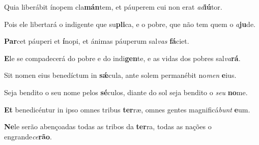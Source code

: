 \begin{greenumerate}
  \switchcolumn*


  \item Quia liberábit ínopem cla\textbf{mán}tem, {\GreStar} et páuperem cui non erat \textit{ad}\textbf{iú}tor. 

  \switchcolumn%

  \item Pois ele libertará o indigente que su\textbf{pli}ca, {\GreStar} e o pobre, que não tem quem o \textit{a}\textbf{ju}de. 

  \switchcolumn*


  \item \textbf{Par}cet páuperi et \textbf{í}nopi, {\GreStar} et ánimas páuperum sal\textit{vas} \textbf{fá}ciet. 

  \switchcolumn%

  \item \textbf{E}le se compadecerá do pobre e do indi\textbf{gen}te, {\GreStar} e as vidas dos pobres sal\textit{va}\textbf{rá}. 

  \switchcolumn*


  \item Sit nomen eius benedíctum in \textbf{sǽ}cula, {\GreStar} ante solem permanébit no\textit{men} \textbf{e}ius. 

  \switchcolumn%

  \item Seja bendito o seu nome pelos \textbf{sé}culos, {\GreStar} diante do sol seja bendito o \textit{seu} \textbf{no}me. 

  \switchcolumn*


  \item \textbf{Et} benedicéntur in ipso omnes tribus \textbf{ter}ræ, {\GreStar} omnes gentes magnificá\textit{bunt} \textbf{e}um. 

  \switchcolumn%

  \item \textbf{Ne}le serão abençoadas todas as tribos da \textbf{ter}ra, {\GreStar} todas as nações o engrande\textit{ce}\textbf{rão}. 
\end{greenumerate}